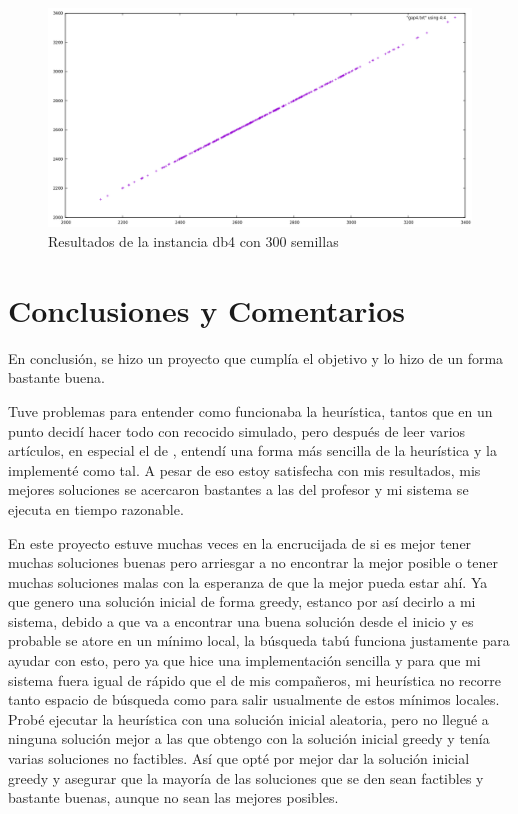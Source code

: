 \documentclass{article}
\begin{document}
\begin{figure}[H]
	\centering
	\includegraphics[scale=0.5]{imgs/gap4.png}
	\caption{Resultados de la instancia db4 con 300 semillas}
\end{figure}

\section{Conclusiones y Comentarios}

En conclusión, se hizo un proyecto que cumplía el objetivo y lo hizo de un forma bastante buena.

Tuve problemas para entender como funcionaba la heurística, tantos que en un punto decidí hacer todo con recocido simulado, pero después de leer varios artículos, en especial el de \cite{clever}, entendí una forma más sencilla de la heurística y la implementé como tal. A pesar de eso estoy satisfecha con mis resultados, mis mejores soluciones se acercaron bastantes a las del profesor y mi sistema se ejecuta en tiempo razonable.

En este proyecto estuve muchas veces en la encrucijada de si es mejor tener muchas soluciones buenas pero arriesgar a no encontrar la mejor posible o tener muchas soluciones malas con la esperanza de que la mejor pueda estar ahí. Ya que genero una solución inicial de forma greedy, estanco por así decirlo a mi sistema, debido a que va a encontrar una buena solución desde el inicio y es probable se atore en un mínimo local, la búsqueda tabú funciona justamente para ayudar con esto, pero ya que hice una implementación sencilla y para que mi sistema fuera igual de rápido que el de mis compañeros, mi heurística no recorre tanto espacio de búsqueda como para salir usualmente de estos mínimos locales. Probé ejecutar la heurística con una solución inicial aleatoria, pero no llegué a ninguna solución mejor a las que obtengo con la solución inicial greedy y tenía varias soluciones no factibles. Así que opté por mejor dar la solución inicial greedy y asegurar que la mayoría de las soluciones que se den sean factibles y bastante buenas, aunque no sean las mejores posibles.
\end{document}
